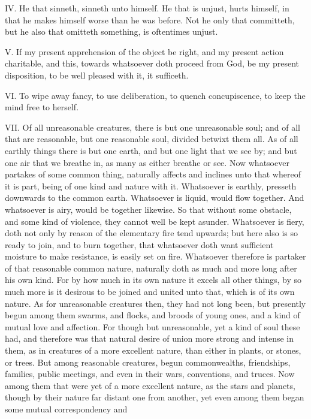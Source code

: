 IV. He that sinneth, sinneth unto himself. He that is unjust, hurts
himself, in that he makes himself worse than he was before. Not he only
that committeth, but he also that omitteth something, is oftentimes
unjust.

V. If my present apprehension of the object be right, and my present
action charitable, and this, towards whatsoever doth proceed from God, be
my present disposition, to be well pleased with it, it sufficeth.

VI. To wipe away fancy, to use deliberation, to quench concupiscence, to
keep the mind free to herself.

VII. Of all unreasonable creatures, there is but one unreasonable soul;
and of all that are reasonable, but one reasonable soul, divided betwixt
them all. As of all earthly things there is but one earth, and but one
light that we see by; and but one air that we breathe in, as many as
either breathe or see. Now whatsoever partakes of some common thing,
naturally affects and inclines unto that whereof it is part, being of one
kind and nature with it. Whatsoever is earthly, presseth downwards to the
common earth. Whatsoever is liquid, would flow together. And whatsoever is
airy, would be together likewise. So that without some obstacle, and some
kind of violence, they cannot well be kept asunder. Whatsoever is fiery,
doth not only by reason of the elementary fire tend upwards; but here also
is so ready to join, and to burn together, that whatsoever doth want
sufficient moisture to make resistance, is easily set on fire. Whatsoever
therefore is partaker of that reasonable common nature, naturally doth as
much and more long after his own kind. For by how much in its own nature
it excels all other things, by so much more is it desirous to be joined
and united unto that, which is of its own nature. As for unreasonable
creatures then, they had not long been, but presently begun among them
swarms, and flocks, and broods of young ones, and a kind of mutual love
and affection. For though but unreasonable, yet a kind of soul these had,
and therefore was that natural desire of union more strong and intense in
them, as in creatures of a more excellent nature, than either in plants,
or stones, or trees. But among reasonable creatures, begun commonwealths,
friendships, families, public meetings, and even in their wars,
conventions, and truces. Now among them that were yet of a more excellent
nature, as the stars and planets, though by their nature far distant one
from another, yet even among them began some mutual correspondency and

